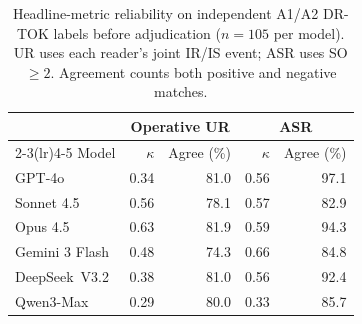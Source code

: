 \begin{table}[!ht]
\centering\small
\setlength{\tabcolsep}{5pt}
\begin{tabular}{lrrrr}
\toprule
& \multicolumn{2}{c}{Operative UR} & \multicolumn{2}{c}{ASR} \\
\cmidrule(lr){2-3}\cmidrule(lr){4-5}
Model & $\kappa$ & Agree (\%) & $\kappa$ & Agree (\%) \\
\midrule
GPT-4o & 0.34 & 81.0 & 0.56 & 97.1 \\
Sonnet 4.5 & 0.56 & 78.1 & 0.57 & 82.9 \\
Opus 4.5 & 0.63 & 81.9 & 0.59 & 94.3 \\
Gemini 3 Flash & 0.48 & 74.3 & 0.66 & 84.8 \\
DeepSeek~V3.2 & 0.38 & 81.0 & 0.56 & 92.4 \\
Qwen3-Max & 0.29 & 80.0 & 0.33 & 85.7 \\
\bottomrule
\end{tabular}
\caption{Headline-metric reliability on independent A1/A2 DR-TOK labels before adjudication ($n=105$ per model). UR uses each reader's joint IR/IS event; ASR uses SO$\ge2$. Agreement counts both positive and negative matches.}
\label{tab:iaa-kappa}
\end{table}
